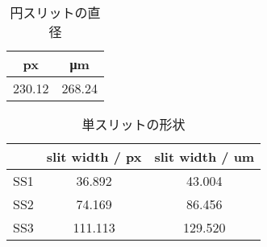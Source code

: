 \begin{table}[!htp]\centering
	\caption{円スリットの直径}\label{tab:circle_slit_diameter}
	\scriptsize
	\begin{tabular}{cc}\toprule
		px     & \si{\micro\meter} \\\midrule
		230.12 & 268.24            \\
		\bottomrule
	\end{tabular}
\end{table}

\begin{table}[!htp]\centering
	\caption{単スリットの形状}\label{tab:ss_slits}
	\scriptsize
	\begin{tabular}{ccc}\toprule
		    & slit width / px & slit width / \si{um} \\\midrule
		SS1 & 36.892          & 43.004               \\
		SS2 & 74.169          & 86.456               \\
		SS3 & 111.113         & 129.520              \\
		\bottomrule
	\end{tabular}
\end{table}

